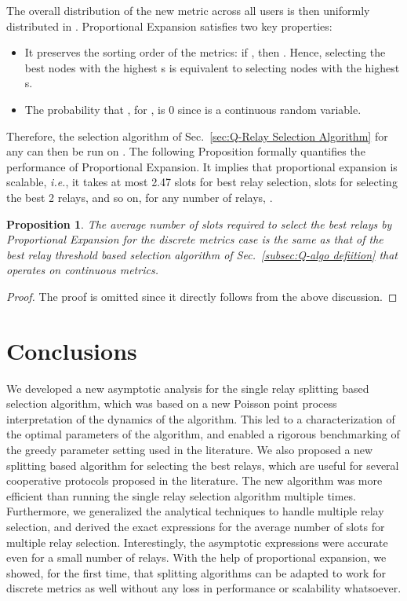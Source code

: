 \documentclass[12pt,draftcls,peerreview, onecolumn]{IEEEtran}
\newtheorem{proposition}{Proposition}
\newcommand{\ie}{{\it i.e.}}
\begin{document}
The overall distribution of the new metric across all users is then
uniformly distributed in .  Proportional Expansion satisfies two key
properties:
\begin{itemize}
\item It preserves the sorting order of the metrics: if , then . Hence, selecting the best 
  nodes with the highest s is equivalent to selecting  nodes
  with the highest s.

\item The probability that , for , is 0 since
   is a continuous random variable.
\end{itemize}

Therefore, the selection algorithm of Sec.~\ref{sec:Q-Relay Selection
  Algorithm} for any  can then be run on .  The
following Proposition formally quantifies the performance of
Proportional Expansion. It implies that proportional expansion is
scalable, \ie, it takes at most 2.47 slots for best relay selection,
 slots for selecting the best 2 relays, and so on, for any
number of relays, .

\begin{proposition}
\label{disc_metric}
The average number of slots required to select the best  relays by
Proportional Expansion for the discrete metrics case is the same as
that of the best  relay threshold based selection algorithm of
Sec.~\ref{subsec:Q-algo defiition} that operates on continuous
metrics.
\end{proposition}
\begin{proof}
The proof is omitted since it directly follows from the above discussion.
\end{proof}






\section{Conclusions}
\label{sec:conclusions}

We developed a new asymptotic analysis for the single relay splitting
based selection algorithm, which was based on a new Poisson point
process interpretation of the dynamics of the algorithm. This led to a
characterization of the optimal parameters of the algorithm, and
enabled a rigorous benchmarking of the greedy parameter setting used
in the literature. We also proposed a new splitting based algorithm
for selecting the best  relays, which are useful for several
cooperative protocols proposed in the literature. The new algorithm
was more efficient than running the single relay selection algorithm
multiple times. Furthermore, we generalized the analytical techniques
to handle multiple relay selection, and derived the exact expressions
for the average number of slots for multiple relay selection.
Interestingly, the asymptotic expressions were accurate even for a
small number of relays. With the help of proportional expansion, we
showed, for the first time, that splitting algorithms can be adapted
to work for discrete metrics as well without any loss in performance
or scalability whatsoever.
\end{document}
